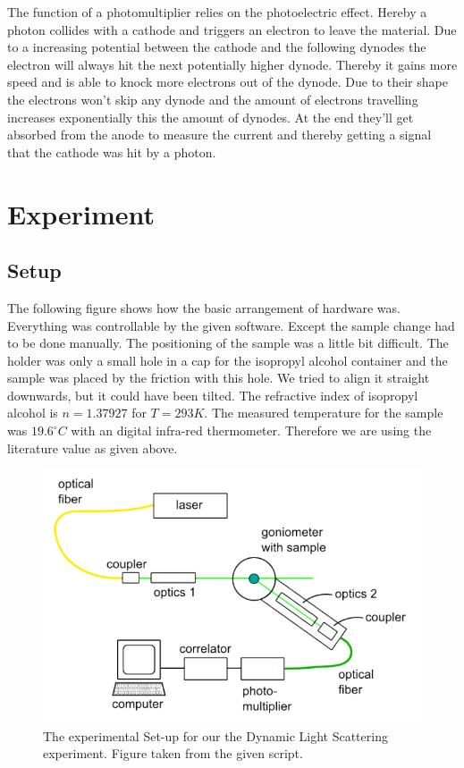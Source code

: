 \documentclass[]{article}
\begin{document}
The function of a photomultiplier relies on the photoelectric effect. Hereby a photon collides with a cathode and triggers an electron to leave the material.
Due to a increasing potential between the cathode and the following dynodes the electron will always hit the next potentially higher dynode. Thereby it gains more speed and is able to knock more electrons out of the dynode. Due to their shape the electrons won't skip any dynode and the amount of electrons travelling increases exponentially this the amount of dynodes. At the end they'll get absorbed from the anode to measure the current and thereby getting a signal that the cathode was hit by a photon.

\newpage
\section{Experiment}
\subsection{Setup}
The following figure shows how the basic arrangement of hardware was. Everything was controllable by the given software. Except the sample change had to be done manually. The positioning of the sample was a little bit difficult. The holder was only a small hole in a cap for the isopropyl alcohol container and the sample was placed by the friction with this hole. We tried to align it straight downwards, but it could have been tilted. The refractive index of isopropyl alcohol is $n=1.37927$ for $T=293K$. The measured temperature for the sample was $19.6 ^\circ C$ with an digital infra-red thermometer. Therefore we are using the literature value as given above.

\begin{figure}[!htbp]
\centering
\includegraphics[width=0.8\linewidth]{Plots/Setup.png}
\caption{The experimental Set-up for our the Dynamic Light Scattering experiment. Figure taken from the given script.}
\end{figure}
\end{document}
